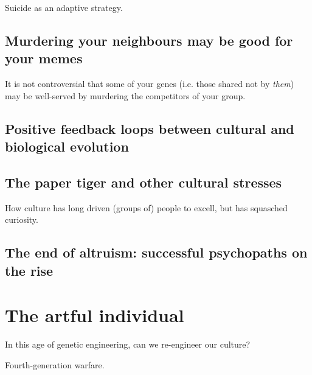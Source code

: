 \documentclass{article}
\begin{document}
Suicide as an adaptive strategy.

\subsection{Murdering your neighbours may be good for your memes}

It is not controversial that some of your genes (i.e. those shared not by \emph{them}) may be well-served by murdering the competitors of your group.

\subsection{Positive feedback loops between cultural and biological evolution}

\subsection{The paper tiger and other cultural stresses}

How culture has long driven (groups of) people to excell, but has squasched curiosity.

\subsection{The end of altruism: successful psychopaths on the rise}

\section{The artful individual}

In this age of genetic engineering, can we re-engineer our culture?

Fourth-generation warfare.



\end{document}
